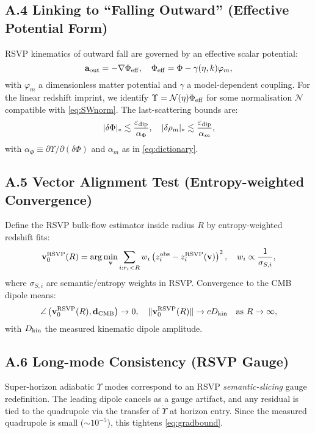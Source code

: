 \documentclass{article}
\begin{document}
{{\subsection*{A.4 Linking to ``Falling Outward'' (Effective Potential Form)}
RSVP kinematics of outward fall are governed by an effective scalar potential:
\begin{equation}
\mathbf{a}_{\rm out} = -\nabla \Phi_{\rm eff}, \quad \Phi_{\rm eff} = \Phi - \gamma(\eta,k) \varphi_m,
\label{eq:phieff}
\end{equation}
with \(\varphi_m\) a dimensionless matter potential and \(\gamma\) a model-dependent coupling. For the linear redshift imprint, we identify \(\Upsilon = \mathcal{N}(\eta) \Phi_{\rm eff}\) for some normalisation \(\mathcal{N}\) compatible with \eqref{eq:SWnorm}. The last-scattering bounds are:
\begin{equation}
|\delta\Phi|_* \lesssim \frac{\varepsilon_{\rm dip}}{\alpha_\Phi}, \quad |\delta\rho_m|_* \lesssim \frac{\varepsilon_{\rm dip}}{\alpha_m},
\label{eq:componentbounds}
\end{equation}
with \(\alpha_\Phi \equiv \partial \Upsilon / \partial (\delta\Phi)\) and \(\alpha_m\) as in \eqref{eq:dictionary}.

\subsection*{A.5 Vector Alignment Test (Entropy-weighted Convergence)}
Define the RSVP bulk-flow estimator inside radius \(R\) by entropy-weighted redshift fits:
\begin{equation}
\mathbf{v}_0^{\rm RSVP}(R) = \arg\min_{\mathbf{v}} \sum_{i: r_i < R} w_i \left( z_i^{\rm obs} - z_i^{\rm RSVP}(\mathbf{v}) \right)^2, \quad w_i \propto \frac{1}{\sigma_{S,i}},
\end{equation}
where \(\sigma_{S,i}\) are semantic/entropy weights in RSVP. Convergence to the CMB dipole means:
\begin{equation}
\angle \left( \mathbf{v}_0^{\rm RSVP}(R), \mathbf{d}_{\rm CMB} \right) \to 0, \quad \|\mathbf{v}_0^{\rm RSVP}(R)\| \to c D_{\rm kin} \quad \text{as } R \to \infty,
\end{equation}
with \(D_{\rm kin}\) the measured kinematic dipole amplitude.

\subsection*{A.6 Long-mode Consistency (RSVP Gauge)}
Super-horizon adiabatic \(\Upsilon\) modes correspond to an RSVP \textit{semantic-slicing} gauge redefinition. The leading dipole cancels as a gauge artifact, and any residual is tied to the quadrupole via the transfer of \(\dot{\Upsilon}\) at horizon entry. Since the measured quadrupole is small (\(\sim 10^{-5}\)), this tightens \eqref{eq:gradbound}.

}}
\end{document}
